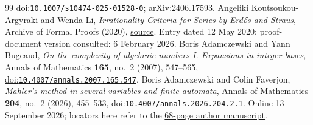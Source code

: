 \documentclass[11pt]{article}
\begin{document}
\begin{thebibliography}{99}
  \href{https://doi.org/10.1007/s10474-025-01528-0}{doi:\nolinkurl{10.1007/s10474-025-01528-0}}; arXiv:\href{https://arxiv.org/abs/2406.17593}{2406.17593}.
 Angeliki Koutsoukou-Argyraki and Wenda Li,
  \emph{Irrationality Criteria for Series by Erd\H{o}s and Straus}, Archive of Formal Proofs (2020),
  \href{https://isa-afp.org/entries/Irrational_Series_Erdos_Straus.html}{source}. Entry dated 12 May 2020; proof-document version consulted: 6 February 2026.
 Boris Adamczewski and Yann Bugeaud,
  \emph{On the complexity of algebraic numbers I. Expansions in integer bases},
  Annals of Mathematics \textbf{165}, no.~2 (2007), 547--565,
  \href{https://doi.org/10.4007/annals.2007.165.547}{doi:\nolinkurl{10.4007/annals.2007.165.547}}.
 Boris Adamczewski and Colin Faverjon,
  \emph{Mahler's method in several variables and finite automata},
  Annals of Mathematics \textbf{204}, no.~2 (2026), 455--533,
  \href{https://doi.org/10.4007/annals.2026.204.2.1}{doi:\nolinkurl{10.4007/annals.2026.204.2.1}}.
  Online 13 September 2026; locators here refer to the
  \href{https://faverjon.perso.math.cnrs.fr/AdamczewskiFaverjon_MahlerFiniteAutomata.pdf}{68-page author manuscript}.
\end{thebibliography}

\companionpapercontext
\end{document}
